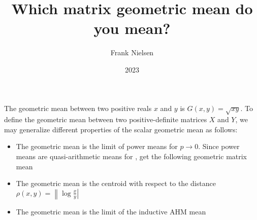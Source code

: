 \documentclass{article}
\title{Which matrix geometric mean do you mean?}
\author{Frank Nielsen}
\date{2023}
\begin{document}
The geometric mean between two positive reals $x$ and $y$ is $G(x,y)=\sqrt{xy}$.
To define the geometric mean between two positive-definite matrices $X$ and $Y$, we may generalize different properties of the scalar geometric mean as follows:

\begin{itemize}
	\item The geometric mean is the limit of power means for $p\rightarrow 0$.
	Since power means are quasi-arithmetic means for , get the following geometric matrix mean
	
	\item The geometric mean is the centroid with respect to the distance $\rho(x,y)=\left\| \log\frac{x}{y}\right|$
	
	\item The geometric mean is the limit of the inductive AHM mean
	
\end{itemize}




\end{document}
